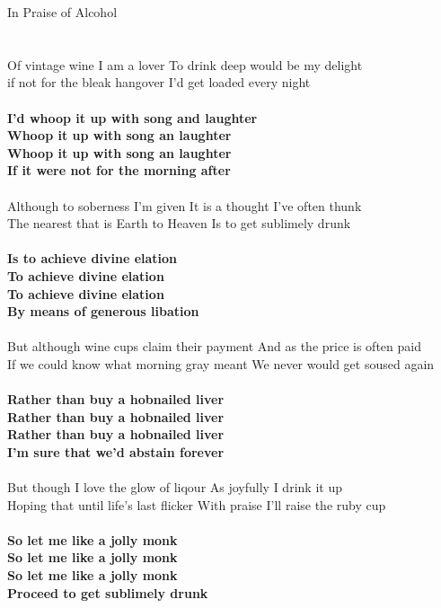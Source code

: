 \documentclass[letterpaper,9pt]{article}
\begin{document}
\newpage
{}
\huge
In Praise of Alcohol\\
\\
\Large
\noindent
\\Of vintage wine I am a lover To drink deep would be my delight
\\if not for the bleak hangover I'd get loaded every night
\\
\\\textbf{I'd whoop it up with song and laughter
\\Whoop it up with song an laughter
\\Whoop it up with song an laughter
\\If it were not for the morning after}
\\
\\Although to soberness I'm given It is a thought I've often thunk
\\The nearest that is Earth to Heaven Is to get sublimely drunk
\\
\\\textbf{Is to achieve divine elation
\\To achieve divine elation
\\To achieve divine elation
\\By means of generous libation}
\\
\\But although wine cups claim their payment And as the price is often paid
\\If we could know what morning gray meant We never would get soused again
\\
\\\textbf{Rather than buy a hobnailed liver
\\Rather than buy a hobnailed liver
\\Rather than buy a hobnailed liver
\\I'm sure that we'd abstain forever}
\\
\\But though I love the glow of liqour As joyfully I drink it up
\\Hoping that until life's last flicker With praise I'll raise the ruby cup
\\
\\\textbf{So let me like a jolly monk
\\So let me like a jolly monk
\\So let me like a jolly monk
\\Proceed to get sublimely drunk}
\end{document}
